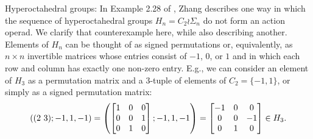 \begin{example}
\begin{enumerate}


Hyperoctahedral groups: In Example 2.28 of \cite{zhang-grp}, Zhang describes one way in which the sequence of hyperoctahedral groups $H_n = C_2 \wr \Sigma_n$ do not form an action operad. We clarify that counterexample here, while also describing another. Elements of $H_n$ can be thought of as signed permutations or, equivalently, as $n \times n$ invertible matrices whose entries consist of $-1$, $0$, or $1$ and in which each row and column has exactly one non-zero entry. E.g., we can consider an element of $H_3$ as a permutation matrix and a $3$-tuple of elements of $C_2 = \{-1,1\}$, or simply as a signed permutation matrix:
  \[
    \left(( 2 \, \, 3 )
    ;
    -1,1,-1\right)
    =
    \left(\begin{bmatrix}
    1 & 0 & 0 \\
    0 & 0 & 1 \\
    0 & 1 & 0
    \end{bmatrix}
    ;
    -1,1,-1\right)
    =
    \begin{bmatrix}
    -1 & 0 & 0 \\
    0 & 0 & -1 \\
    0 & 1 & 0
    \end{bmatrix}
    \in H_3.
  \]


\end{enumerate}
\end{example}
